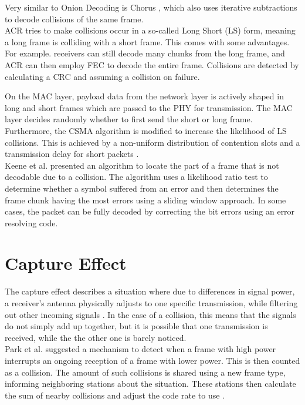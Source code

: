 Very similar to Onion Decoding is Chorus \cite{zhang2010}, which also uses iterative subtractions to decode collisions of the same frame.\\

\gls{ACR} \cite{wu2010} tries to make collisions occur in a so-called Long Short (LS) form, meaning a long frame is colliding with a short frame. This comes with some advantages. For example. receivers can still decode many chunks from the long frame, and \gls{ACR} can then employ \gls{FEC} to decode the entire frame. Collisions are detected by calculating a \gls{CRC} and assuming a collision on failure.

On the \gls{MAC} layer, payload data from the network layer is actively shaped in long and short frames which are passed to the \gls{PHY} for transmission. The \gls{MAC} layer decides randomly whether to first send the short or long frame. Furthermore, the \gls{CSMA} algorithm is modified to increase the likelihood of LS collisions. This is achieved by a non-uniform distribution of contention slots and a transmission delay for short packets \cite{wu2010}.\\

Keene et al. \cite{keene2010} presented an algorithm to locate the part of a frame that is not decodable due to a collision. The algorithm uses a likelihood ratio test to determine whether a symbol suffered from an error and then determines the frame chunk having the most errors using a sliding window approach. In some cases, the packet can be fully decoded by correcting the bit errors using an error resolving code.



\section{Capture Effect}\label{sec:related-capture}

The capture effect describes a situation where due to differences in signal power, a receiver's antenna physically adjusts to one specific transmission, while filtering out other incoming signals \cite{kim1999}. In the case of a collision, this means that the signals do not simply add up together, but it is possible that one transmission is received, while the the other one is barely noticed.\\

Park et al. suggested a mechanism to detect when a frame with high power interrupts an ongoing reception of a frame with lower power. This is then counted as a collision. The amount of such collisions is shared using a new frame type, informing neighboring stations about the situation. These stations then calculate the sum of nearby collisions and adjust the code rate to use \cite{park2009}.\\

